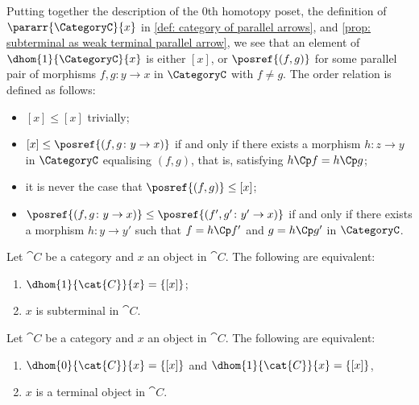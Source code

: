 %
%
Putting together the description of the 0th homotopy poset, the definition of $\pararr{\CategoryC}{x}$ in \autoref{def: category of parallel arrows}, and \autoref{prop: subterminal as weak terminal parallel arrow}, we see that an element of $\dhom{1}{\CategoryC}{x}$ is either $[x]$, or $\posref{(f, g)}$ for some parallel pair of morphisms $f, g\colon y \to x$ in $\CategoryC$ with $f \neq g$.
    The order relation is defined as follows:
    \begin{itemize}
        \item $[x] \leq [x]$ trivially;
        \item $[x] \leq \posref{(f, g\colon y \to x)}$ if and only if there exists a morphism $h\colon z \to y$ in $\CategoryC$ equalising $(f, g)$, that is, satisfying $h\Cp f = h\Cp g$;
        \item it is never the case that $\posref{(f, g)} \leq [x]$;
        \item $\posref{(f, g\colon y \to x)} \leq \posref{(f', g'\colon y' \to x)}$ if and only if there exists a morphism $h\colon y \to y'$ such that $f = h\Cp f'$ and $g = h\Cp g'$ in $\CategoryC$.
    \end{itemize}
%
%
\begin{proposition} \label{prop:dhom1_trivial_when_subterminal}
Let $\cat{C}$ be a category and $x$ an object in $\cat{C}$.
The following are equivalent:
\begin{enumerate}[label=(\alph*)]
    \item $\dhom{1}{\cat{C}}{x} = \{[x]\}$;
    \item $x$ is subterminal in $\cat{C}$.
\end{enumerate}
\end{proposition}

\begin{corollary} \label{prop:dhoms_trivial_when_terminal}
Let $\cat{C}$ be a category and $x$ an object in $\cat{C}$.
The following are equivalent:
\begin{enumerate}[label=(\alph*)]
    \item $\dhom{0}{\cat{C}}{x} = \{[x]\}$ and $\dhom{1}{\cat{C}}{x} = \{[x]\}$,
    \item $x$ is a terminal object in $\cat{C}$.
\end{enumerate}
\end{corollary}

